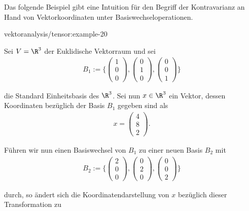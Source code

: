 \documentclass[letterpaper,10pt,english]{jupyterBook}
\begin{document}
\par
Das folgende Beispiel gibt eine Intuition für den Begriff der Kontravarianz an Hand von Vektorkoordinaten unter Basiswechseloperationen.
\begin{example}{}{vektoranalysis/tensor:example-20}



\par
Sei \(V = \R^3\) der Euklidische Vektorraum und sei
\begin{align*}
B_1 := \lbrace \begin{pmatrix}1\\ 0\\ 0\end{pmatrix}, \begin{pmatrix}0\\ 1\\ 0\end{pmatrix}, \begin{pmatrix}0\\ 0\\ 1\end{pmatrix} \rbrace
\end{align*}
\par
die Standard Einheitsbasis des \(\R^3\).
Sei nun \(x \in \R^3\) ein Vektor, dessen Koordinaten bezüglich der Basis \(B_1\) gegeben sind als
\begin{align*}
x = \begin{pmatrix}4\\ 8\\ 2\end{pmatrix}.
\end{align*}
\par
Führen wir nun einen Basiswechsel von \(B_1\) zu einer neuen Basis \(B_2\) mit
\begin{align*}
B_2 := \lbrace \begin{pmatrix}2\\ 0\\ 0\end{pmatrix}, \begin{pmatrix}0\\ 2\\ 0\end{pmatrix}, \begin{pmatrix}0\\ 0\\ 2\end{pmatrix} \rbrace
\end{align*}
\par
durch, so ändert sich die Koordinatendarstellung von \(x\) bezüglich dieser Transformation zu

\end{example}
\end{document}
